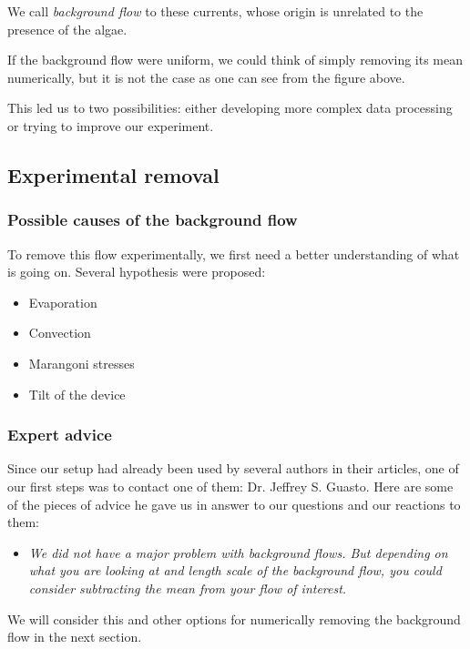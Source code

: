 We call \textit{background flow} to these currents, whose origin is unrelated to the presence of the algae.

If the background flow were uniform, we could think of simply removing its mean numerically, but it is not the case as one can see from the figure above. 

This led us to two possibilities: either developing more complex data processing or trying to improve our experiment. 

\subsection{Experimental removal}

\subsubsection{Possible causes of the background flow}

To remove this flow experimentally, we first need a better understanding of what is going on. Several hypothesis were proposed:

\begin{itemize}
	\item Evaporation
	\item Convection
	\item Marangoni stresses
	\item Tilt of the device
\end{itemize}

\subsubsection{Expert advice}

Since our setup had already been used by several authors in their articles, one of our first steps was to contact one of them: Dr. Jeffrey S. Guasto. Here are some of the pieces of advice he gave us in answer to our questions and our reactions to them:

\begin{itemize}
	\item \textit{We did not have a major problem with background flows. But depending on what you are looking at and length scale of the background flow, you could consider subtracting the mean from your flow of interest.}
\end{itemize}

We will consider this and other options for numerically removing the background flow in the next section.

